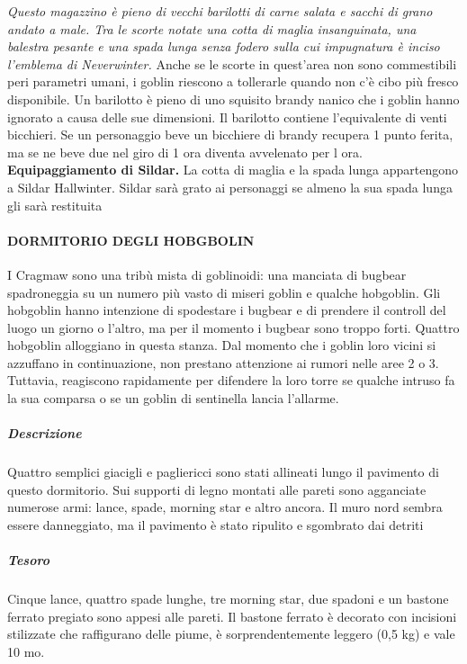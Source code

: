 \documentclass{article}
\begin{document}
\textit{ Questo magazzino è pieno di vecchi barilotti di carne salata e
sacchi di grano andato a male. Tra le scorte notate una cotta
di maglia insanguinata, una balestra pesante e una spada
lunga senza fodero sulla cui impugnatura è inciso l'emblema
di Neverwinter. } 
Anche se le scorte in quest'area non sono commestibili peri
parametri umani, i goblin riescono a tollerarle quando non c'è
cibo più fresco disponibile.
Un barilotto è pieno di uno squisito brandy nanico che
i goblin hanno ignorato a causa delle sue dimensioni.
Il barilotto contiene l'equivalente di venti bicchieri. Se
un personaggio beve un bicchiere di brandy recupera 1
punto ferita, ma se ne beve due nel giro di 1 ora diventa
avvelenato per l ora. \\ 
\textbf{Equipaggiamento di Sildar.} La cotta di maglia e la spada
lunga appartengono a Sildar Hallwinter. Sildar sarà grato ai
personaggi se almeno la sua spada lunga gli sarà restituita
\paragraph{DORMITORIO DEGLI HOBGBOLIN}
I Cragmaw sono una tribù mista di goblinoidi: una manciata
di bugbear spadroneggia su un numero più vasto di miseri
goblin e qualche hobgoblin. Gli hobgoblin hanno intenzione
di spodestare i bugbear e di prendere il controll del luogo un giorno o l’altro, ma per il momento i bugbear sono
troppo forti. Quattro hobgoblin alloggiano in questa stanza. Dal momento
che i goblin loro vicini si azzuffano in continuazione, non
prestano attenzione ai rumori nelle aree 2 o 3. Tuttavia,
reagiscono rapidamente per difendere la loro torre se qualche
intruso fa la sua comparsa o se un goblin di sentinella
lancia l'allarme. 
\subparagraph{Descrizione} Quattro semplici giacigli e pagliericci sono stati allineati
lungo il pavimento di questo dormitorio. Sui supporti di
legno montati alle pareti sono agganciate numerose armi:
lance, spade, morning star e altro ancora. Il muro nord
sembra essere danneggiato, ma il pavimento è stato ripulito e
sgombrato dai detriti 

\subparagraph{Tesoro}
Cinque lance, quattro spade lunghe, tre morning star, due
spadoni e un bastone ferrato pregiato sono appesi alle pareti.
Il bastone ferrato è decorato con incisioni stilizzate che
raffigurano delle piume, è sorprendentemente leggero (0,5 kg)
e vale 10 mo.
\end{document}
